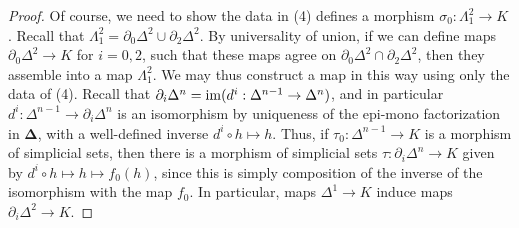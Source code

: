 \begin{proof}
	Of course, we need to show the data in (4) defines a morphism $\sigma_0 : \Lambda_1^2 \to K$. Recall that $\Lambda_1^2=\partial _0\Delta^2 \cup \partial_2\Delta^2$. By universality of union, if we can define maps $\partial _0\Delta^2 \to K$ for $i=0,2$, such that these maps agree on $\partial_0\Delta^2 \cap \partial_2\Delta^2$, then they assemble into a map $\Lambda_1^2$. We may thus construct a map in this way using only the data of (4). Recall that $\partial _i\Delta^n= \operatorname{im} (d^i : \Delta^{n-1}  \to \Delta^n)$, and in particular $d^i : \Delta^{n-1} \to \partial _i\Delta^n$ is an isomorphism by uniqueness of the epi-mono factorization in $\boldsymbol{\Delta} $, with a well-defined inverse $d^i\circ h\mapsto h$. Thus, if $\tau_0 : \Delta^{n-1}  \to K$ is a morphism of simplicial sets, then there is a morphism of simplicial sets $\tau : \partial _i\Delta^n \to K$ given by $d^i\circ h\mapsto h\mapsto f_0(h)$, since this is simply composition of the inverse of the isomorphism with the map $f_0$. In particular, maps $\Delta^1\to K$ induce maps $\partial _i\Delta^2\to K$.


\end{proof}
